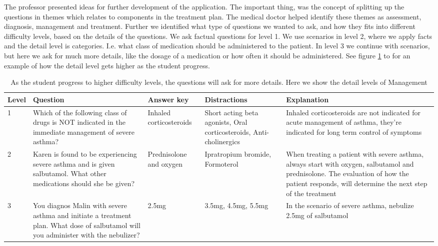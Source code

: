 The professor presented ideas for further development of the application. The important thing, was the concept of splitting up the questions in themes which relates to components in the treatment plan. The medical doctor helped identify these themes as assessment, diagnosis, management and treatment. Further we identified what type of questions we wanted to ask, and how they fits into different difficulty levels, based on the details of the questions. We ask factual questions for level 1. We use scenarios in level 2, where we apply facts and the detail level is categories. I.e. what class of medication should be administered to the patient. In level 3 we continue with scenarios, but here we ask for much more details, like the dosage of a medication or how often it should be administered. See figure \ref{table:QuestionsDetailLevels} to for an example of how the detail level gets higher as the student progress.

\begin{table}[h!]
	\begin{tabular}{ | m{2em} | m{7em}| m{5em} | m{5em}| m{7em} |} 
		\hline
		Level & Question & Answer key & Distractions & Explanation \\
		\hline
		1 & Which of the following class of drugs is NOT indicated in the immediate management of severe asthma? & Inhaled corticosteroids & Short acting beta agonists, Oral corticosteroids, Anti-cholinergics & Inhaled corticosteroids are not indicated for acute management of asthma, they're indicated for long term control of symptoms \\
		\hline
		2 & Karen is found to be experiencing severe asthma and is given salbutamol. What other medications should she be given? & Prednisolone and oxygen & Ipratropium bromide, Formoterol & When  treating a patient with severe asthma, always start with oxygen, salbutamol and prednisolone. The evaluation of how the patient responds, will determine the next step of the treatment \\ 
		\hline
		3 & You diagnos Malin with severe asthma and initiate a treatment plan. What dose of salbutamol will you administer with the nebulizer? & 2.5mg & 3.5mg, 4.5mg, 5.5mg & In the scenario of severe asthma, nebulize 2.5mg of salbutamol \\
		\hline
	\end{tabular}
\caption{As the student progress to higher difficulty levels, the questions will ask for more details. Here we show the detail levels of Management}
	\label{table:QuestionsDetailLevels}
\end{table}

